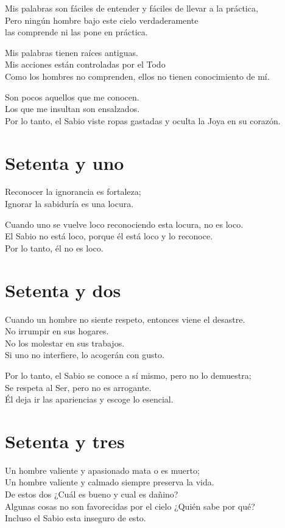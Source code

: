\documentclass[hidelinks]{memoir}
\begin{document}
	Mis palabras son fáciles de entender y fáciles de llevar a la
	práctica,\\
	Pero ningún hombre bajo este cielo verdaderamente\\
	las comprende ni las pone en práctica.
	
	Mis palabras tienen raíces antiguas.\\
	Mis acciones están controladas por el Todo\\
	Como los hombres no comprenden, ellos no tienen conocimiento de mí.
	
	Son pocos aquellos que me conocen.\\
	Los que me insultan son ensalzados.\\
	Por lo tanto, el Sabio viste ropas gastadas y oculta la Joya en su
	corazón.
	
	\chapter*{Setenta y uno}
	
	Reconocer la ignorancia es fortaleza;\\
	Ignorar la sabiduría es una locura.
	
	Cuando uno se vuelve loco reconociendo esta locura, no es loco.\\
	El Sabio no está loco, porque él está loco y lo reconoce.\\
	Por lo tanto, él no es loco.
	
	\chapter*{Setenta y dos}
	
	Cuando un hombre no siente respeto, entonces viene el desastre.\\
	No irrumpir en sus hogares.\\
	No los molestar en sus trabajos.\\
	Si uno no interfiere, lo acogerán con gusto.
	
	Por lo tanto, el Sabio se conoce a sí mismo, pero no lo demuestra;\\
	Se respeta al Ser, pero no es arrogante.\\
	Él deja ir las apariencias y escoge lo esencial.
	
	\chapter*{Setenta y tres}
	
	Un hombre valiente y apasionado mata o es muerto;\\
	Un hombre valiente y calmado siempre preserva la vida.\\
	De estos dos ¿Cuál es bueno y cual es dañino?\\
	Algunas cosas no son favorecidas por el cielo ¿Quién sabe por qué?\\
	Incluso el Sabio esta inseguro de esto.
	
\end{document}
